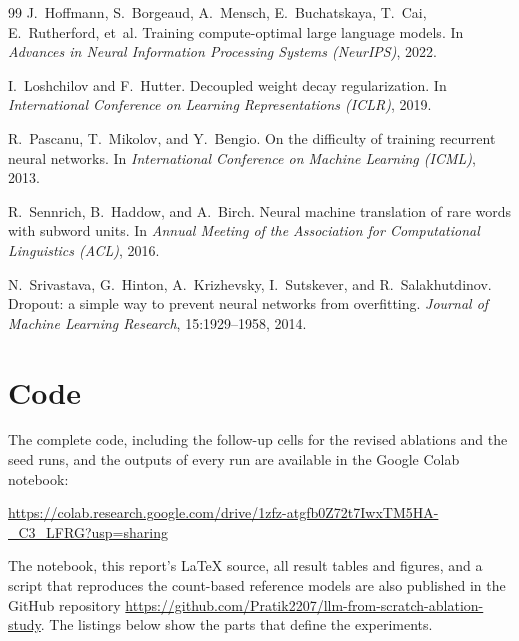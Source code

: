 \documentclass[11pt,a4paper]{article}
\newcommand{\colaburl}{https://colab.research.google.com/drive/1zfz-atgfb0Z72t7IwxTM5HA-_C3_LFRG?usp=sharing}
\begin{document}
\begin{thebibliography}{99}
J.~Hoffmann, S.~Borgeaud, A.~Mensch, E.~Buchatskaya, T.~Cai, E.~Rutherford, et~al.
\newblock Training compute-optimal large language models.
\newblock In \emph{Advances in Neural Information Processing Systems (NeurIPS)}, 2022.

I.~Loshchilov and F.~Hutter.
\newblock Decoupled weight decay regularization.
\newblock In \emph{International Conference on Learning Representations (ICLR)}, 2019.

R.~Pascanu, T.~Mikolov, and Y.~Bengio.
\newblock On the difficulty of training recurrent neural networks.
\newblock In \emph{International Conference on Machine Learning (ICML)}, 2013.

R.~Sennrich, B.~Haddow, and A.~Birch.
\newblock Neural machine translation of rare words with subword units.
\newblock In \emph{Annual Meeting of the Association for Computational Linguistics (ACL)}, 2016.

N.~Srivastava, G.~Hinton, A.~Krizhevsky, I.~Sutskever, and R.~Salakhutdinov.
\newblock Dropout: a simple way to prevent neural networks from overfitting.
\newblock \emph{Journal of Machine Learning Research}, 15:1929--1958, 2014.

\end{thebibliography}

\clearpage
\appendix

\section{Code}\label{app:code}

The complete code, including the follow-up cells for the revised ablations and the seed runs, and the outputs of every run are available in the Google Colab notebook:
\begin{center}
  \url{\colaburl}
\end{center}
The notebook, this report's LaTeX source, all result tables and figures, and a script that reproduces the count-based reference models are also published in the GitHub repository \url{https://github.com/Pratik2207/llm-from-scratch-ablation-study}. The listings below show the parts that define the experiments.
\end{document}
